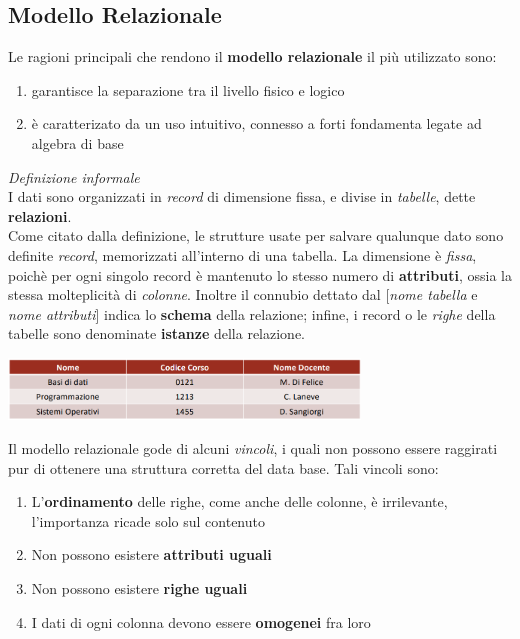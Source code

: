 \documentclass{article}
\begin{document}
\subsection*{Modello Relazionale}
\large
Le ragioni principali che rendono il \textbf{modello relazionale} il più utilizzato sono:
\begin{enumerate}
    \renewcommand{\labelenumi}{-}
    \itemsep0em
    \item garantisce la separazione tra il livello fisico e logico
    \item è caratterizato da un uso intuitivo, connesso a forti fondamenta legate ad algebra di base
\end{enumerate}\vspace{14pt}
\textit{Definizione informale}\\I dati sono organizzati in \textit{record} di dimensione fissa, e divise in \textit{tabelle}, dette \textbf{relazioni}.\vspace{14pt}\\Come citato dalla definizione, le strutture usate per salvare qualunque dato sono definite \textit{record}, memorizzati all'interno di una tabella. La dimensione è \textit{fissa}, poichè per ogni singolo record è mantenuto lo stesso numero di \textbf{attributi}, ossia la stessa molteplicità di \textit{colonne}. Inoltre il connubio dettato dal [\textit{nome tabella} e \textit{nome attributi}] indica lo \textbf{schema} della relazione; infine, i record o le \textit{righe} della tabelle sono denominate \textbf{istanze} della relazione.
\begin{center}
    \includegraphics[width = 0.7\textwidth]{foto 2.png}
\end{center}
Il modello relazionale gode di alcuni \textit{vincoli}, i quali non possono essere raggirati pur di ottenere una struttura corretta del data base. Tali vincoli sono:
\begin{enumerate}
    \renewcommand{\labelenumi}{-}
    \itemsep0em
    \item L'\textbf{ordinamento} delle righe, come anche delle colonne, è irrilevante, l'importanza ricade solo sul contenuto
    \item Non possono esistere \textbf{attributi uguali}
    \item Non possono esistere \textbf{righe uguali}
    \item I dati di ogni colonna devono essere \textbf{omogenei} fra loro
\end{enumerate}
\end{document}
